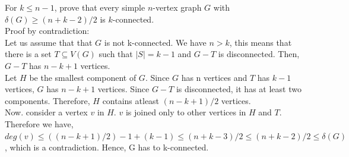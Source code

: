 \documentclass[12pt]{article}
\newenvironment{question}[2][Question]{\begin{trivlist}
\item[\hskip \labelsep {\bfseries #1}\hskip \labelsep {\bfseries #2.}]}{\end{trivlist}}
\begin{document}
\begin{question}{2}
For $k \leq n - 1$, prove that every simple $n$-vertex graph $G$ with $\delta(G) \geq (n+k-2)/2$ is $k$-connected. \\

Proof by contradiction: \\
Let us assume that that $G$ is not k-connected. We have $n > k$, this means that there is a set $T \subseteq V(G)$ such that $|S|= k-1$ and $G-T$ is disconnected. Then, $G-T$ has $n-k+1$ vertices. \\
Let $H$ be the smallest component of $G$. Since $G$ has n vertices and $T$ has $k-1$ vertices, $G$ has $n-k+1$ vertices. Since $G-T$ is disconnected, it has at least two components. Therefore, $H$ contains atleast $(n-k+1)/2$ vertices. \\
Now. consider a vertex $v$ in $H$. $v$ is joined only to other vertices in $H$ and $T$. Therefore we have, \\
$deg(v) \leq ((n-k+1)/2)-1+(k-1) \leq (n+k-3)/2 \leq (n+k-2)/2 \leq \delta(G)$, which is a contradiction.
Hence, G has to k-connected. \\

\end{question}
\end{document}
